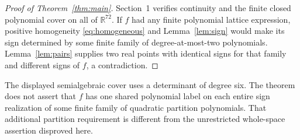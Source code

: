 \documentclass[11pt]{article}
\newcommand{\R}{\mathbb R}
\begin{document}
\begin{proof}[Proof of Theorem~\ref{thm:main}]
Section~1 verifies continuity and the finite closed polynomial
cover on all of \(\R^{72}\).
If \(f\) had any finite polynomial lattice expression,
positive homogeneity \eqref{eq:homogeneous} and Lemma~\ref{lem:sign}
would make its sign determined by some finite family of
degree-at-most-two polynomials. Lemma~\ref{lem:pairs} supplies
two real points with identical signs for that family and different
signs of \(f\), a contradiction.
\end{proof}

The displayed semialgebraic cover uses a determinant of degree six.
The theorem does not assert that \(f\) has one shared polynomial
label on each entire sign realization of some finite family of
quadratic partition polynomials. That additional partition requirement
is different from the unrestricted whole-space assertion disproved
here.
\end{document}
